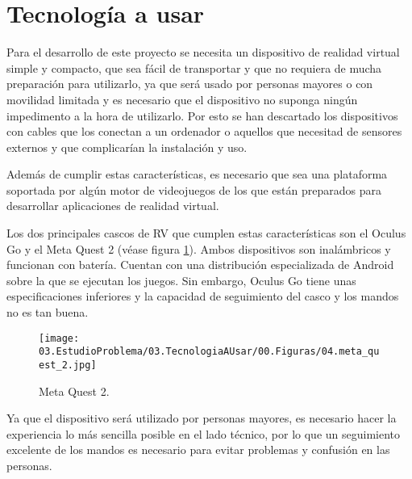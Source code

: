 




\section{Tecnología a usar}
\label{sec:tecnologiaUsar}






Para el desarrollo de este proyecto se necesita un dispositivo de realidad virtual simple y compacto, que sea fácil de transportar y que no requiera de mucha preparación para utilizarlo, ya que será usado por personas mayores o con movilidad limitada y es necesario que el dispositivo no suponga ningún impedimento a la hora de utilizarlo. Por esto se han descartado los dispositivos con cables que los conectan a un ordenador o aquellos que necesitad de sensores externos y que complicarían la instalación y uso.

Además de cumplir estas características, es necesario que sea una plataforma soportada por algún motor de videojuegos de los que están preparados para desarrollar aplicaciones de realidad virtual.

Los dos principales cascos de RV que cumplen estas características son el Oculus Go y el Meta Quest 2 (véase figura \ref{fig:TU_oculusQuest}). Ambos dispositivos son inalámbricos y funcionan con batería. Cuentan con una distribución especializada de Android sobre la que se ejecutan los juegos. Sin embargo, Oculus Go tiene unas especificaciones inferiores y la capacidad de seguimiento del casco y los mandos no es tan buena.

\begin{figure}
  \centering
\texttt{[image: 03.EstudioProblema/03.TecnologiaAUsar/00.Figuras/04.meta\_quest\_2.jpg]}
    \caption{Meta Quest 2. \cite{EA_img_oculusQuest}}
    \label{fig:TU_oculusQuest}
\end{figure}

Ya que el dispositivo será utilizado por personas mayores, es necesario hacer la experiencia lo más sencilla posible en el lado técnico, por lo que un seguimiento excelente de los mandos es necesario para evitar problemas y confusión en las personas.

